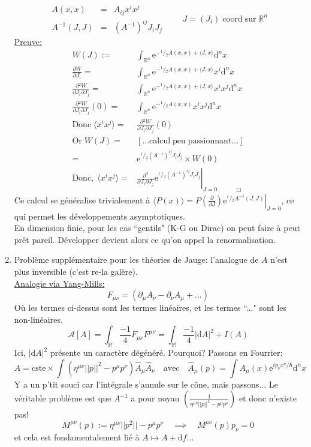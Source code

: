 \documentclass[a4paper,11pt]{article}
\renewcommand{\d}{{\mathrm{d}}}
\newcommand{\e}{{\mathrm{e}}}
\newcommand{\dr}[2]{\frac{\partial {#1}}{\partial{#2}}}
\begin{document}
\begin{enumerate}
$$\begin{matrix}
A(x,x) & = & A_{ij}x^ix^j\\
A^{-1}(J,J) & = & (A^{-1})^{ij} J_i J_j
\end{matrix}
 \quad \quad J=(J_i) \;\mathrm{coord}\;\mathrm{sur}\;\mathbb{R}^n$$
 \underline{Preuve:}
 \begin{align*}
 W(J):=& \int_{\mathbb{R}^n} \e^{-^1\!/\!_2A(x,x)+\langle J,x \rangle}\d^n x\\
 \dr W {J_i} =& \int_{\mathbb{R}^n} \e^{-^1\!/\!_2A(x,x)+\langle J,x \rangle} x^i\d^n x
 \\
 \dr {^2W} {J_i\partial J_j} =& \int_{\mathbb{R}^n} \e^{-^1\!/\!_2A(x,x)+\langle J,x \rangle} x^ix^j\d^n x\\
 \dr {^2W} {J_i\partial J_j}(0) =& \int_{\mathbb{R}^n} \e^{-^1\!/\!_2A(x,x)} x^ix^j\d^n x\\
 \mathrm{Donc}\; \langle x^ix^j\rangle =& \dr {^2W} {J_i\partial J_j}(0)\\
 \mathrm{Or}\; W(J) =& [...\mathrm{calcul}\;\mathrm{peu}\;\mathrm{passionnant}...]\\ =& \e^{^1\!/\!_2(A^{-1})^{ij}J_iJ_j} \times W(0)\\
 \mathrm{Donc}, \; \langle x^ix^j\rangle =& \left.\dr {^2} {J_i\partial J_j} \e^{^1\!/\!_2(A^{-1})^{ij}J_iJ_j}\right|_{J=0\quad \quad \quad \Box}
 \end{align*}
 Ce calcul se généralise trivialement à $\langle P(x)\rangle = \left.P\left(\dr{}J\right) \e^{^1\!/\!_2A^{-1}(J,J)}\right|_{J=0}$, ce qui permet les développements asymptotiques.\\
 En dimension finie, pour les cas ``gentils" (K-G ou Dirac) on peut faire à peut prêt pareil. Développer devient alors ce qu'on appel la renormalisation.
 \item Problème supplémentaire pour les théories de Jauge: l'analogue de $A$ n'est plus inversible (c'est re-la galère).\\
 \underline{Analogie via Yang-Mills:}
 $$F_{\mu\nu}=(\partial_\mu A_\nu - \partial_\nu A_\mu + ...)$$
 Où les termes ci-dessus sont les termes linéaires, et les termes ``..." sont les non-linéaires.
 $$\mathcal{A}[A] = \int_\mathbb{M} \frac{-1}{4}F_{\mu\nu}F^{\mu\nu} = \int_\mathbb{M}\frac{-1}{4}|\d A|^2 + I(A)$$
 Ici, $|\d A|^2$ présente un caractère dégénéré. Pourquoi? Passons en Fourrier:
 $$A= \mathrm{cste}\times \int (\eta^{\mu\nu} ||p||^2-p^\mu p^\nu) \hat A_\mu \hat A_\nu \quad \mathrm{avec}\quad \hat A_\mu(p) = \int A_\mu(x) \e^{i p_\nu x^\nu /\hbar}\d^n x$$
 Y a un p'tit souci car l'intégrale s'annule sur le cône, mais passons... Le véritable problème est que $A^{-1}$ a pour noyau $\left(\frac{1}{\eta^{\mu\nu} ||p||^2-p^\mu p^\nu}\right)$ et donc n'existe pas!
 $$M^{\mu\nu}(p):=\eta^{\mu\nu}||p^2|| - p^\mu p^\nu \quad \implies \quad M^{\mu\nu}(p) p_\nu = 0$$
 et cela est fondamentalement lié à $A\mapsto A+\d f$...
\end{enumerate}
\end{document}
